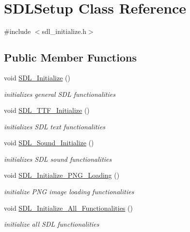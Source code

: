 \hypertarget{class_s_d_l_setup}{}\section{S\+D\+L\+Setup Class Reference}
\label{class_s_d_l_setup}


{\ttfamily \#include $<$sdl\+\_\+initialize.\+h$>$}

\subsection*{Public Member Functions}
\begin{DoxyCompactItemize}
\item 
\hypertarget{class_s_d_l_setup_a8f1af036a91016960b0e0c6b1eef59b5}{}\label{class_s_d_l_setup_a8f1af036a91016960b0e0c6b1eef59b5} 
void \hyperlink{class_s_d_l_setup_a8f1af036a91016960b0e0c6b1eef59b5}{S\+D\+L\+\_\+\+Initialize} ()
\begin{DoxyCompactList}\small\item\em initializes general S\+DL functionalities \end{DoxyCompactList}\item 
\hypertarget{class_s_d_l_setup_a0bd7e38447486e113b028d3ac103f135}{}\label{class_s_d_l_setup_a0bd7e38447486e113b028d3ac103f135} 
void \hyperlink{class_s_d_l_setup_a0bd7e38447486e113b028d3ac103f135}{S\+D\+L\+\_\+\+T\+T\+F\+\_\+\+Initialize} ()
\begin{DoxyCompactList}\small\item\em initializes S\+DL text functionalities \end{DoxyCompactList}\item 
\hypertarget{class_s_d_l_setup_a10915963c4804e2b54e95ad32a6c2ace}{}\label{class_s_d_l_setup_a10915963c4804e2b54e95ad32a6c2ace} 
void \hyperlink{class_s_d_l_setup_a10915963c4804e2b54e95ad32a6c2ace}{S\+D\+L\+\_\+\+Sound\+\_\+\+Initialize} ()
\begin{DoxyCompactList}\small\item\em initializes S\+DL sound functionalities \end{DoxyCompactList}\item 
\hypertarget{class_s_d_l_setup_a1e8bb8b91a5f39ce518e41ebfaff9d0a}{}\label{class_s_d_l_setup_a1e8bb8b91a5f39ce518e41ebfaff9d0a} 
void \hyperlink{class_s_d_l_setup_a1e8bb8b91a5f39ce518e41ebfaff9d0a}{S\+D\+L\+\_\+\+Initialize\+\_\+\+P\+N\+G\+\_\+\+Loading} ()
\begin{DoxyCompactList}\small\item\em initialize P\+NG image loading functionalities \end{DoxyCompactList}\item 
\hypertarget{class_s_d_l_setup_a3cef4c8a341ab40b6826f2d81497e114}{}\label{class_s_d_l_setup_a3cef4c8a341ab40b6826f2d81497e114} 
void \hyperlink{class_s_d_l_setup_a3cef4c8a341ab40b6826f2d81497e114}{S\+D\+L\+\_\+\+Initialize\+\_\+\+All\+\_\+\+Functionalities} ()
\begin{DoxyCompactList}\small\item\em initialize all S\+DL functionalities \end{DoxyCompactList}\end{DoxyCompactItemize}


